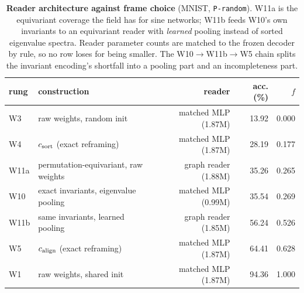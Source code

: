 \begin{table}[t]
\centering\small
\caption{\textbf{Reader architecture against frame choice} (MNIST, \texttt{P-random}). W11a is the equivariant coverage the field has for sine networks; W11b feeds W10's own invariants to an equivariant reader with \emph{learned} pooling instead of sorted eigenvalue spectra. Reader parameter counts are matched to the frozen decoder by rule, so no row loses for being smaller. The W10$\to$W11b$\to$W5 chain splits the invariant encoding's shortfall into a pooling part and an incompleteness part.}
\label{tab:w11}
\begin{tabular}{@{}llrrr@{}}
\toprule
rung & construction & reader & acc. (\%) & $f$ \\
\midrule
W3 & raw weights, random init & matched MLP (1.87M) & 13.92 & 0.000 \\
W4 & $c_{\mathrm{sort}}$ (exact reframing) & matched MLP (1.87M) & 28.19 & 0.177 \\
W11a & permutation-equivariant, raw weights & graph reader (1.88M) & 35.26 & 0.265 \\
\midrule
W10 & exact invariants, eigenvalue pooling & matched MLP (0.99M) & 35.54 & 0.269 \\
W11b & same invariants, learned pooling & graph reader (1.85M) & 56.24 & 0.526 \\
\midrule
W5 & $c_{\mathrm{align}}$ (exact reframing) & matched MLP (1.87M) & 64.41 & 0.628 \\
W1 & raw weights, shared init & matched MLP (1.87M) & 94.36 & 1.000 \\
\bottomrule
\end{tabular}
\end{table}
